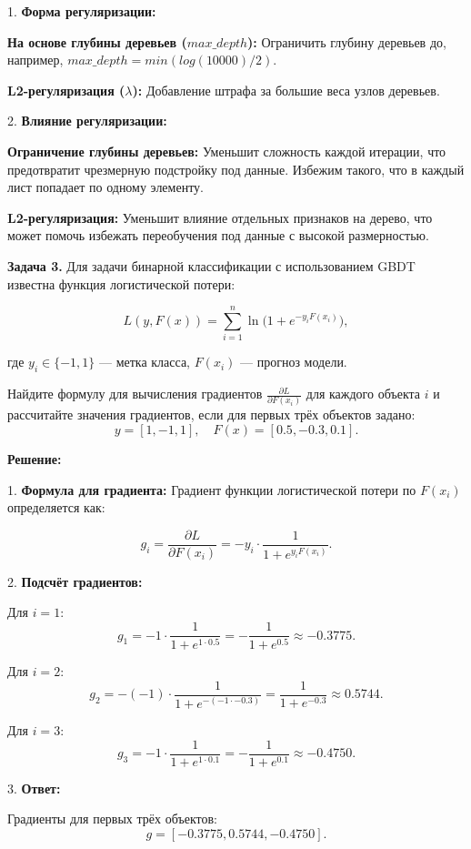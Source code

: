 1. \textbf{Форма регуляризации:}  
\vspace{0.3cm}

\textbf{На основе глубины деревьев (\(max\_depth\)):}  
Ограничить глубину деревьев до, например, \(max\_depth = min(log(10000)/2)\).  
\vspace{0.3cm}

\textbf{L2-регуляризация (\(\lambda\)):}  
Добавление штрафа за большие веса узлов деревьев. 
\vspace{0.5cm}

2. \textbf{Влияние регуляризации:}  
\vspace{0.3cm}

\textbf{Ограничение глубины деревьев:}  
Уменьшит сложность каждой итерации, что предотвратит чрезмерную подстройку под данные. Избежим такого, что в каждый лист попадает по одному элементу. 
\vspace{0.3cm}

\textbf{L2-регуляризация:}  
Уменьшит влияние отдельных признаков на дерево, что может помочь избежать переобучения под данные с высокой размерностью.  






\vspace{1cm}

\textbf{Задача 3.}  
Для задачи бинарной классификации с использованием GBDT известна функция логистической потери:  

\[
L(y, F(x)) = \sum_{i=1}^n \ln\big(1 + e^{-y_i F(x_i)}\big),
\]

где \(y_i \in \{-1, 1\}\) — метка класса, \(F(x_i)\) — прогноз модели.  

Найдите формулу для вычисления градиентов \(\frac{\partial L}{\partial F(x_i)}\) для каждого объекта \(i\) и рассчитайте значения градиентов, если для первых трёх объектов задано:  
\[
y = [1, -1, 1], \quad F(x) = [0.5, -0.3, 0.1].
\]

\textbf{Решение:}  

1. \textbf{Формула для градиента:}  
Градиент функции логистической потери по \(F(x_i)\) определяется как:  

\[
g_i = \frac{\partial L}{\partial F(x_i)} = -y_i \cdot \frac{1}{1 + e^{y_i F(x_i)}}.
\]

2. \textbf{Подсчёт градиентов:}  

Для \(i = 1\):  
\[
g_1 = -1 \cdot \frac{1}{1 + e^{1 \cdot 0.5}} = -\frac{1}{1 + e^{0.5}} \approx -0.3775.
\]

Для \(i = 2\):  
\[
g_2 = -(-1) \cdot \frac{1}{1 + e^{-(-1 \cdot -0.3)}} = \frac{1}{1 + e^{-0.3}} \approx 0.5744.
\]

Для \(i = 3\):  
\[
g_3 = -1 \cdot \frac{1}{1 + e^{1 \cdot 0.1}} = -\frac{1}{1 + e^{0.1}} \approx -0.4750.
\]

3. \textbf{Ответ:}  

Градиенты для первых трёх объектов:  
\[
g = [-0.3775, 0.5744, -0.4750].
\]
